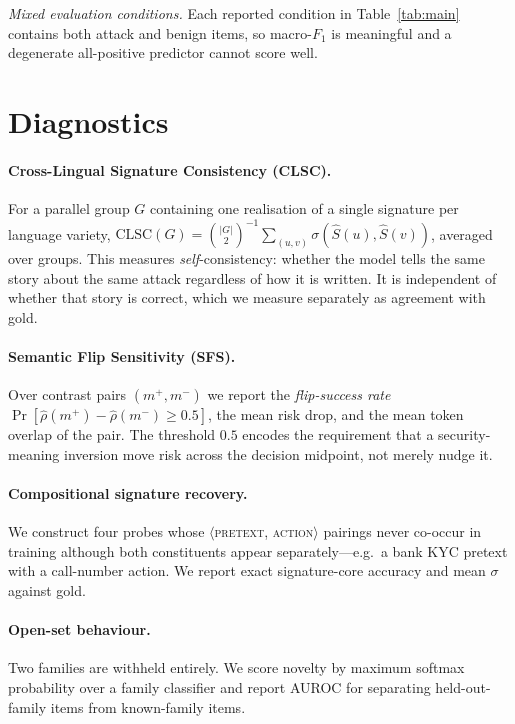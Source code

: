 \documentclass[11pt,a4paper]{article}
\newcommand{\sig}{\ensuremath{\sigma}}
\begin{document}
\emph{Mixed evaluation conditions.} Each reported condition in
Table~\ref{tab:main} contains both attack and benign items, so macro-$F_1$ is
meaningful and a degenerate all-positive predictor cannot score well.

\section{Diagnostics}
\label{sec:metrics}

\paragraph{Cross-Lingual Signature Consistency (CLSC).}
For a parallel group $G$ containing one realisation of a single signature per
language variety, $\mathrm{CLSC}(G) = \binom{|G|}{2}^{-1}
\sum_{(u,v)} \sig(\hat S(u), \hat S(v))$, averaged over groups. This measures
\emph{self}-consistency: whether the model tells the same story about the same
attack regardless of how it is written. It is independent of whether that story
is correct, which we measure separately as agreement with gold.

\paragraph{Semantic Flip Sensitivity (SFS).}
Over contrast pairs $(m^{+}, m^{-})$ we report the \emph{flip-success rate}
$\Pr[\hat\rho(m^{+}) - \hat\rho(m^{-}) \geq 0.5]$, the mean risk drop, and the
mean token overlap of the pair. The threshold $0.5$ encodes the requirement that
a security-meaning inversion move risk across the decision midpoint, not merely
nudge it.

\paragraph{Compositional signature recovery.}
We construct four probes whose $\langle$\textsc{pretext}, \textsc{action}$\rangle$
pairings never co-occur in training although both constituents appear
separately---e.g.\ a bank KYC pretext with a call-number action. We report exact
signature-core accuracy and mean \sig{} against gold.

\paragraph{Open-set behaviour.}
Two families are withheld entirely. We score novelty by maximum softmax
probability over a family classifier \cite{hendrycks2017baseline} and report
AUROC for separating held-out-family items from known-family items.
\end{document}
